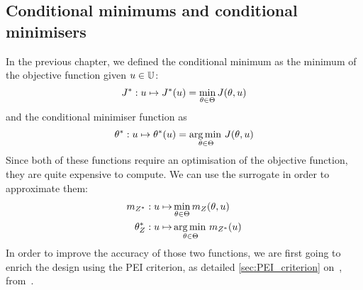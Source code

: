 \documentclass[../../Main_ManuscritThese.tex]{subfiles}
\begin{document}
\subsection{Conditional minimums and conditional minimisers}
\label{ssec:croco_cond_minimum_minimisers}


In the previous chapter, we defined the conditional minimum as the
minimum of the objective function given $u\in \mathbb{U}$:
\begin{equation}
  J^* : u \mapsto J^*(u) = \min_{\theta\in\Theta} J(\theta, u)
\end{equation}
and the conditional minimiser function as
\begin{equation}
  \theta^*:u  \mapsto \theta^*(u) = \operatorname*{arg\,min \,}_{\theta \in \Theta} J(\theta, u)
\end{equation}
Since both of these functions require an optimisation of the objective
function, they are quite expensive to compute. We can use the
surrogate in order to approximate them:
\begin{align}
  m_{Z^*}: u\mapsto &\min_{\theta \in \Theta} m_Z(\theta, u) \\
  \theta^*_{Z}: u  \mapsto &\operatorname*{arg\,min \,}_{\theta \in \Theta} m_{Z^*}(u)
\end{align}
In order to improve the accuracy of those two functions, we are first
going to enrich the design using the PEI criterion, as detailed
\cref{sec:PEI_criterion} on~,
from~\cite{ginsbourger_bayesian_2014}.
\end{document}
